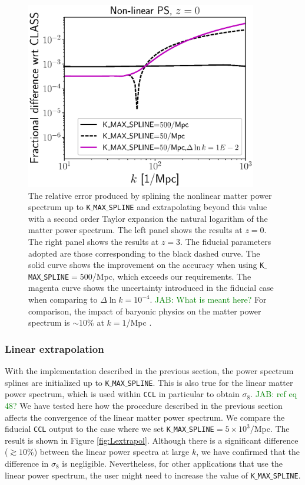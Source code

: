 \documentclass[\docopts]{\docclass}
\newcommand{\jab}[1]{\textcolor{green}{JAB: #1}}
\begin{document}
\begin{figure}
\centering
\includegraphics[width=0.9\textwidth]{PS_converge_nonlin.eps}
\caption{The relative error produced by splining the nonlinear matter power spectrum up to {\tt K$\_$MAX$\_$SPLINE} and extrapolating beyond this value with a second order Taylor expansion the natural logarithm of the matter power spectrum. The left panel shows the results at $z=0$. The right panel shows the results at $z=3$. The fiducial parameters adopted are those corresponding to the black dashed curve. The solid curve shows the improvement on the accuracy when using {\tt K$\_$MAX$\_$SPLINE}$=500$/Mpc, which exceeds our requirements. The magenta curve shows the uncertainty introduced in the fiducial case when comparing to $\Delta\ln k=10^{-4}$. \jab{What is meant here?} For comparison, the impact of baryonic physics on the matter power spectrum is $\sim 10\%$ at $k=1$/Mpc \citep{Schneider15}.}
\label{fig:NLextrapol}
\end{figure}

\subsubsection{Linear extrapolation}
\label{sec:Lextrapol}

With the implementation described in the previous section, the power spectrum splines are initialized up to {\tt K$\_$MAX$\_$SPLINE}. This is also true for the linear matter power spectrum, which is used within {\tt CCL} in particular to obtain $\sigma_8$. \jab{ref eq 48?} We have tested here how the procedure described in the previous section affects the convergence of the linear matter power spectrum. We compare the fiducial {\tt CCL} output to the case where we set {\tt K$\_$MAX$\_$SPLINE}$=5\times 10^3/$Mpc. The result is shown in Figure \ref{fig:Lextrapol}. Although there is a significant difference ($\gtrsim 10\%$) between the linear power spectra at large $k$, we have confirmed that the difference in $\sigma_8$ is negligible. Nevertheless, for other applications that use the linear power spectrum, the user might need to increase the value of {\tt K$\_$MAX$\_$SPLINE}.
\end{document}
